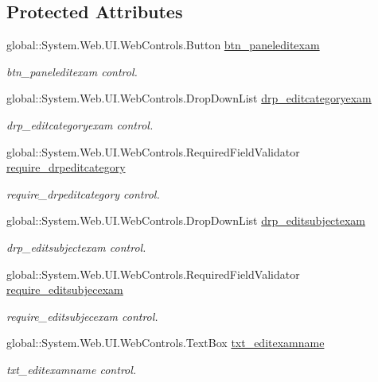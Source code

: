 \subsection*{Protected Attributes}
\begin{DoxyCompactItemize}
\item 
global\+::\+System.\+Web.\+U\+I.\+Web\+Controls.\+Button \mbox{\hyperlink{classeditexam_a54ba3200312bd500f9185a8ded98c922}{btn\+\_\+paneleditexam}}
\begin{DoxyCompactList}\small\item\em btn\+\_\+paneleditexam control. \end{DoxyCompactList}\item 
global\+::\+System.\+Web.\+U\+I.\+Web\+Controls.\+Drop\+Down\+List \mbox{\hyperlink{classeditexam_aa671e694b3dbf5bb08d5ed594ab4894b}{drp\+\_\+editcategoryexam}}
\begin{DoxyCompactList}\small\item\em drp\+\_\+editcategoryexam control. \end{DoxyCompactList}\item 
global\+::\+System.\+Web.\+U\+I.\+Web\+Controls.\+Required\+Field\+Validator \mbox{\hyperlink{classeditexam_a25c626f2837416e3ac17dda595f67192}{require\+\_\+drpeditcategory}}
\begin{DoxyCompactList}\small\item\em require\+\_\+drpeditcategory control. \end{DoxyCompactList}\item 
global\+::\+System.\+Web.\+U\+I.\+Web\+Controls.\+Drop\+Down\+List \mbox{\hyperlink{classeditexam_a1989dcda2e699afabd6fa9117e0eb8f1}{drp\+\_\+editsubjectexam}}
\begin{DoxyCompactList}\small\item\em drp\+\_\+editsubjectexam control. \end{DoxyCompactList}\item 
global\+::\+System.\+Web.\+U\+I.\+Web\+Controls.\+Required\+Field\+Validator \mbox{\hyperlink{classeditexam_aa30b7e69be56709493ea5b3dc76655ea}{require\+\_\+editsubjecexam}}
\begin{DoxyCompactList}\small\item\em require\+\_\+editsubjecexam control. \end{DoxyCompactList}\item 
global\+::\+System.\+Web.\+U\+I.\+Web\+Controls.\+Text\+Box \mbox{\hyperlink{classeditexam_a8d63f58e04baa3794dd9e182f40d966b}{txt\+\_\+editexamname}}
\begin{DoxyCompactList}\small\item\em txt\+\_\+editexamname control. \end{DoxyCompactList}\item 

\end{DoxyCompactItemize}
